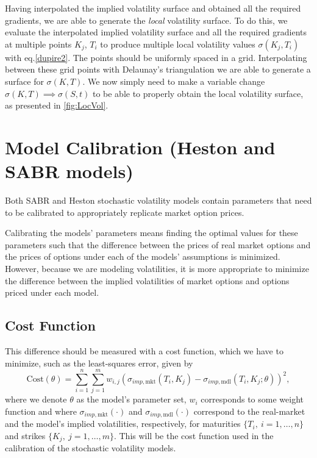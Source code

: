  
Having interpolated the implied volatility surface and obtained all the required gradients, we are able to generate the \emph{local} volatility surface. To do this, we evaluate the interpolated implied volatility surface and all the required gradients at multiple points $K_j$, $T_i$ to produce multiple local volatility values $\sigma(K_j,T_i)$ with eq.\eqref{dupire2}. The points should be uniformly spaced in a grid.
Interpolating between these grid points with Delaunay's triangulation we are able to generate a surface for $\sigma(K,T)$. We now simply need to make a variable change $\sigma(K,T)\implies \sigma(S,t)$ to be able to properly obtain the local volatility surface, as presented in \autoref{fig:LocVol}.


\section{Model Calibration (Heston and SABR models)}
\label{section:Model Calibration}
Both SABR and Heston stochastic volatility models contain parameters that need to be calibrated to appropriately replicate market option prices.


Calibrating the models' parameters means finding the optimal values for these parameters such that the difference between the prices of real market options and the prices of options under each of the models' assumptions is minimized. However, because we are modeling volatilities, it is more appropriate to minimize the difference between the implied volatilities of market options and options priced under each model.

\subsection{Cost Function}
This difference should be measured with a cost function, which we have to minimize, such as the least-squares error, given by
\begin{equation}\label{cost}
\boxed{\mathrm{Cost}(\theta)=\sum_{i=1}^n\sum_{j=1}^mw_{i,j}\left(\sigma_{imp,\mathrm{mkt}}(T_i,K_j)-\sigma_{imp,\mathrm{mdl}}(T_i,K_j;\theta)\right)^2,}
\end{equation}
\noindent where we denote $\theta$ as the model's parameter set, $w_i$ corresponds to some weight function and where $\sigma_{imp,\mathrm{mkt}}(\cdot)$ and $\sigma_{imp,\mathrm{mdl}}(\cdot)$ correspond to the real-market and the model's implied volatilities, respectively, for maturities $\{T_i,\ i=1,\ldots,n\}$ and strikes $\{K_j,\ j=1,\ldots,m\}$. This will be the cost function used in the calibration of the stochastic volatility models.


